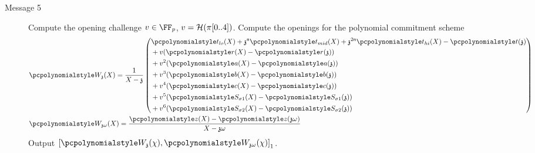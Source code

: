 \begin{description}
\item[Message 5] Compute the opening challenge $v \in \FF_p$,
  $v = \mathcal{H}(\pi[0..4])$.  Compute the openings for the polynomial commitment
  scheme
	\begin{align*}
	& \p{W_\chz}(X) = \frac{1}{X - \chz} \left(
   \begin{aligned}
     & \p{t_{lo}}(X) + \chz^\noofc \p{t_{mid}}(X) + \chz^{2 \noofc} \p{t_{hi}}(X) - \p{t}(\chz)\\
     & + v(\p{r}(X) - \p{r}(\chz)) \\
     & + v^2 (\p{a}(X) - \p{a}(\chz))\\
     & + v^3 (\p{b}(X) - \p{b}(\chz))\\
     & + v^4 (\p{c}(X) - \p{c}(\chz))\\
     & + v^5 (\p{S_{\sigma 1}}(X) - \p{S_{\sigma 1}}(\chz))\\
     & + v^6 (\p{S_{\sigma 2}}(X) - \p{S_{\sigma 2}}(\chz))
   \end{aligned}
       \right)\\
    & \p{W_{\chz \omega}}(X) = \frac{\p{z}(X) - \p{z}(\chz \omega)}{X - \chz \omega}
  \end{align*}
	Output $\gone{\p{W_{\chz}}(\chi), \p{W_{\chz \omega}}(\chi)}$.
\end{description}

